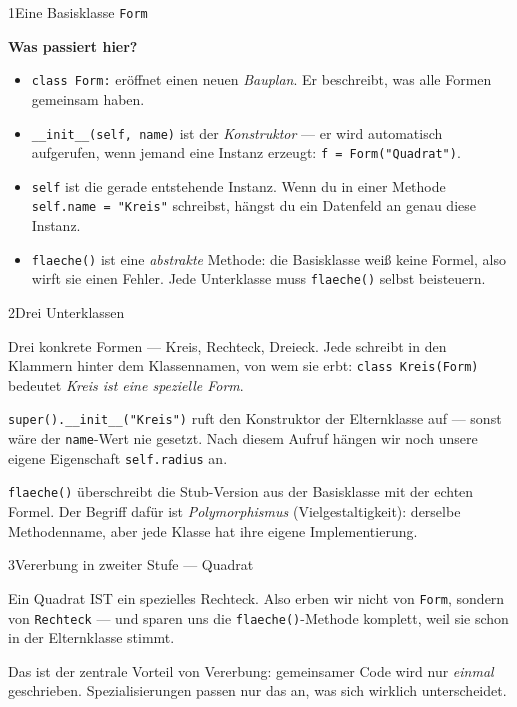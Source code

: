 \begin{pythoneinheit}{1}{Eine Basisklasse \texttt{Form}}

\textbf{Was passiert hier?}

\begin{itemize}
\item \texttt{class Form:} eröffnet einen neuen \emph{Bauplan}. Er
  beschreibt, was alle Formen gemeinsam haben.
\item \texttt{\_\_init\_\_(self, name)} ist der \emph{Konstruktor} —
  er wird automatisch aufgerufen, wenn jemand eine Instanz erzeugt:
  \texttt{f = Form("Quadrat")}.
\item \texttt{self} ist die gerade entstehende Instanz. Wenn du in
  einer Methode \texttt{self.name = "Kreis"} schreibst, hängst du
  ein Datenfeld an genau diese Instanz.
\item \texttt{flaeche()} ist eine \emph{abstrakte} Methode: die
  Basisklasse weiß keine Formel, also wirft sie einen Fehler. Jede
  Unterklasse muss \texttt{flaeche()} selbst beisteuern.
\end{itemize}
\end{pythoneinheit}

\begin{pythoneinheit}{2}{Drei Unterklassen}

Drei konkrete Formen — Kreis, Rechteck, Dreieck. Jede schreibt in den
Klammern hinter dem Klassennamen, von wem sie erbt: \texttt{class
Kreis(Form)} bedeutet \emph{Kreis ist eine spezielle Form}.

\texttt{super().\_\_init\_\_("Kreis")} ruft den Konstruktor der
Elternklasse auf — sonst wäre der \texttt{name}-Wert nie gesetzt.
Nach diesem Aufruf hängen wir noch unsere eigene Eigenschaft
\texttt{self.radius} an.

\texttt{flaeche()} überschreibt die Stub-Version aus der Basisklasse
mit der echten Formel. Der Begriff dafür ist \emph{Polymorphismus}
(Vielgestaltigkeit): derselbe Methodenname, aber jede Klasse hat
ihre eigene Implementierung.
\end{pythoneinheit}

\begin{pythoneinheit}{3}{Vererbung in zweiter Stufe — Quadrat}

Ein Quadrat IST ein spezielles Rechteck. Also erben wir nicht von
\texttt{Form}, sondern von \texttt{Rechteck} — und sparen uns die
\texttt{flaeche()}-Methode komplett, weil sie schon in der
Eltern­klasse stimmt.

Das ist der zentrale Vorteil von Vererbung: gemeinsamer Code wird
nur \emph{einmal} geschrieben. Spezialisierungen passen nur das an,
was sich wirklich unterscheidet.
\end{pythoneinheit}

